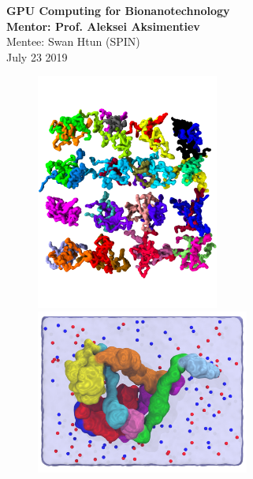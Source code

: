 \documentclass[12ptr]{article}
\begin{document}
\vspace*{5cm}
 \begin{center}
{\huge \bf GPU Computing for Bionanotechnology}\\[0.2cm]
{\large \bf Mentor: Prof. Aleksei Aksimentiev}\\[0.2cm]
{\large Mentee: Swan Htun (SPIN)}\\[0.2cm]
{July 23 2019}\\[0.5cm]
\end{center}

\begin{figure}[!ht]
    \centering
    \includegraphics[width=6cm]{fus400_64_first.pdf}
    \qquad
    \includegraphics[width=7cm]{all_atom_fus1.pdf} 
\end{figure}


\newpage


\tableofcontents
\newpage
\end{document}
